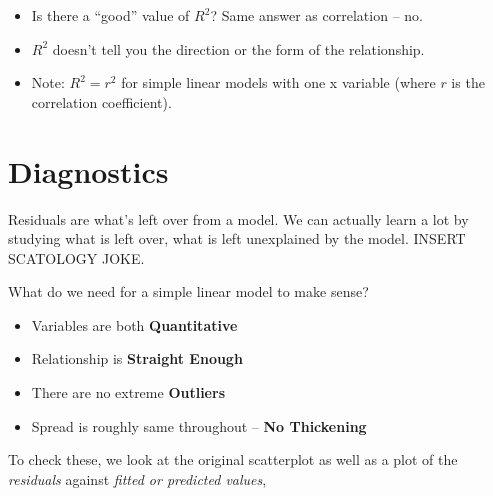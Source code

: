 \documentclass[]{book}
\newenvironment{Shaded}{\begin{snugshade}}{\end{snugshade}}
\newcommand{\DataTypeTok}[1]{\textcolor[rgb]{0.13,0.29,0.53}{#1}}
\newcommand{\DecValTok}[1]{\textcolor[rgb]{0.00,0.00,0.81}{#1}}
\newcommand{\KeywordTok}[1]{\textcolor[rgb]{0.13,0.29,0.53}{\textbf{#1}}}
\newcommand{\NormalTok}[1]{#1}
\newcommand{\OperatorTok}[1]{\textcolor[rgb]{0.81,0.36,0.00}{\textbf{#1}}}
\newcommand{\OtherTok}[1]{\textcolor[rgb]{0.56,0.35,0.01}{#1}}
\newcommand{\StringTok}[1]{\textcolor[rgb]{0.31,0.60,0.02}{#1}}
\begin{document}
\begin{itemize}
\item
  Is there a ``good'' value of \(R^2\)? Same answer as correlation -- no.
\item
  \(R^2\) doesn't tell you the direction or the form of the relationship.
\item
  Note: \(R^2 = r^2\) for simple linear models with one x variable (where \(r\) is the correlation coefficient).
\end{itemize}

\hypertarget{diagnostics}{%
\section{Diagnostics}\label{diagnostics}}

Residuals are what's left over from a model. We can actually learn a lot by studying what is left over, what is left unexplained by the model. INSERT SCATOLOGY JOKE.

What do we need for a simple linear model to make sense?

\begin{itemize}
\item
  Variables are both \textbf{Quantitative}
\item
  Relationship is \textbf{Straight Enough}
\item
  There are no extreme \textbf{Outliers}
\item
  Spread is roughly same throughout -- \textbf{No Thickening}
\end{itemize}

To check these, we look at the original scatterplot as well as a plot of the \emph{residuals} against \emph{fitted or predicted values},

\begin{Shaded}
\end{Shaded}
\end{document}
